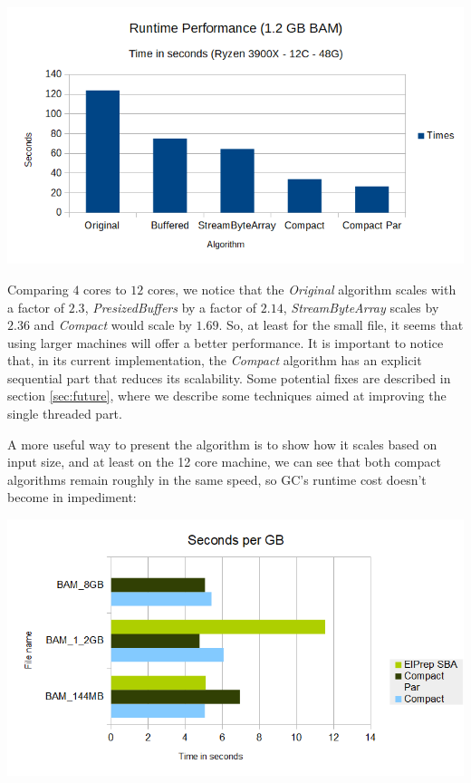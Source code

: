 \documentclass[a4paper,twoside]{article}
\begin{document}
\begin{center}
	\includegraphics[scale=0.5]{images/runtime_perf_1_2G.png}
\end{center}

Comparing $4$ cores to $12$ cores, we notice that the {\textit{Original} } algorithm scales with a factor of $2.3$, {\textit{PresizedBuffers} } by a factor of $2.14$, {\textit{StreamByteArray} } scales by $2.36$ and {\textit{Compact} } would scale by $1.69$. So, at least for the small file, it seems that using larger machines will offer a better performance. It is important to notice that, in its current implementation, the {\textit{Compact} } algorithm has an explicit sequential part that reduces its scalability.
Some potential fixes are described in section \ref{sec:future}, where we describe some techniques aimed at improving the single threaded part.

A more useful way to present the algorithm is to show how it scales based on input size, and at least on the 12 core machine, we can see that both compact algorithms remain roughly in the same speed, so GC's runtime cost doesn't become in impediment:

\begin{center}
	\includegraphics[scale=0.5]{images/seconds_per_gb_ryzen.png}
\end{center}
\end{document}
